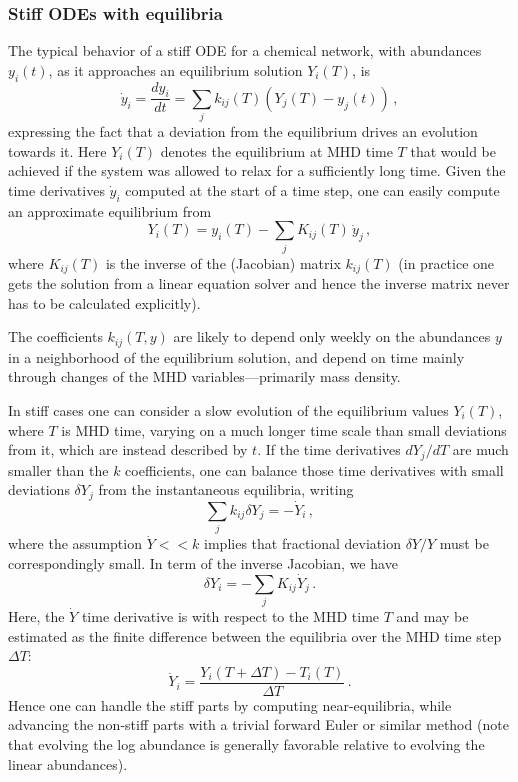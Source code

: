\documentclass[paper=a4,fontsize=11pt]{scrartcl}
\numberwithin{equation}{section}		%
\numberwithin{figure}{section}			%
\numberwithin{table}{section}				%
\begin{document}
\subsubsection{Stiff ODEs with equilibria}
The typical behavior of a stiff ODE for a chemical network, with abundances $y_i(t)$, as it approaches an equilibrium solution $Y_i(T)$, is
\begin{equation}
    \dot{y}_i =\frac{dy_i}{dt} = \sum_j k_{ij}(T) (Y_j(T)-y_j(t))\,,
\end{equation}
expressing the fact that a deviation from the equilibrium drives an evolution towards it.   Here $Y_i(T)$ denotes the equilibrium at MHD time $T$ that would be achieved if the system was allowed to relax for a sufficiently long time.  Given the time derivatives $\dot{y}_i$ computed at the start of a time step, one can easily compute an approximate equilibrium from
\begin{equation}
    Y_i(T) = y_i(T) - \sum_j K_{ij}(T) \, \dot{y}_j \,,
\end{equation}
where $K_{ij}(T)$ is the inverse of the (Jacobian) matrix $k_{ij}(T)$ (in practice one gets the solution from a linear equation solver and hence the inverse matrix never has to be calculated explicitly).

The coefficients $k_{ij}(T,y)$ are likely to depend only weekly on the abundances $y$ in a neighborhood of the equilibrium solution, and depend on time mainly through changes of the MHD variables---primarily mass density.

In stiff cases one can consider a slow evolution of the equilibrium values $Y_i(T)$, where $T$ is MHD time, varying on a much longer time scale than small deviations from it, which are instead described by $t$.  If the time derivatives $dY_j/dT$ are much smaller than the $k$ coefficients, one can balance those time derivatives with small deviations $\delta Y_j$ from the instantaneous equilibria, writing
\begin{equation}
    \sum_j k_{ij} \delta Y_j = - \dot{Y}_i\,,
\end{equation}
where the assumption $\dot{Y} << k$ implies that fractional deviation $\delta Y/Y$ must be correspondingly small.  In term of the inverse Jacobian, we have
\begin{equation}
    \delta {Y}_i = - \sum_j K_{ij} \dot{Y}_j\,.
\end{equation}
Here, the $\dot{Y}$ time derivative is with respect to the MHD time $T$ and may be estimated as the finite difference between the equilibria over the MHD time step $\Delta T$:
\begin{equation}
    \dot{Y}_i = \frac{Y_i(T+\Delta T)- T_i(T)}{\Delta T} \,.
\end{equation}
Hence one can handle the stiff parts by computing near-equilibria, while advancing the non-stiff parts with a trivial forward Euler or similar method (note that evolving the log abundance is generally favorable relative to evolving the linear abundances).
\end{document}
